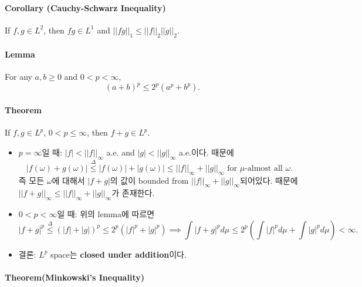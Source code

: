 \documentclass[]{article}
\providecommand{\tightlist}{%
  \setlength{\itemsep}{0pt}\setlength{\parskip}{0pt}}
\let\oldparagraph\paragraph
\renewcommand{\paragraph}[1]{\oldparagraph{#1}\mbox{}}
\begin{document}
\hypertarget{corollary-cauchy-schwarz-inequality}{%
\paragraph{Corollary (Cauchy-Schwarz
Inequality)}\label{corollary-cauchy-schwarz-inequality}}

If \(f,g\in L^2\), then \(fg\in L^1\) and
\(||fg||_1\le ||f||_2||g||_2\).

\hypertarget{lemma-2}{%
\paragraph{Lemma}\label{lemma-2}}

For any \(a,b\ge 0\) and \(0<p<\infty\), \[
(a+b)^p\le 2^p(a^p+b^p).
\]

\hypertarget{theorem}{%
\paragraph{Theorem}\label{theorem}}

If \(f,g\in L^p\), \(0<p\le\infty\), then \(f+g\in L^p\).

\begin{itemize}
\item
  \(p=\infty\)일 때: \(|f|<||f||_\infty\) a.e. and \(|g|<||g||_\infty\)
  a.e.이다. 때문에 \[
     |f(\omega)+g(\omega)|\stackrel{\Delta}{\le} |f(\omega)|+|g(\omega)|\le ||f||_\infty+||g||_\infty \mbox{ for }\mu\mbox{-almost all }\omega.
     \] 즉 모든 \(\omega\)에 대해서 \(|f+g|\)의 값이 bounded from
  \(||f||_\infty+||g||_\infty\)되어있다. 때문에
  \(||f+g||_\infty\le||f||_\infty+||g||_\infty\)가 존재한다.
\item
  \(0<p<\infty\)일 때: 위의 lemma에 따르면 \[
     |f+g|^p\stackrel{\Delta}{\le}(|f|+|g|)^p\le 2^p(|f|^p+|g|^p)\implies \int|f+g|^pd\mu\le 2^p(\int|f|^pd\mu+\int|g|^pd\mu) <\infty.
     \]
\end{itemize}

\begin{itemize}
\tightlist
\item
  결론: \(L^p\) space는 \textbf{closed under addition}이다.
\end{itemize}

\hypertarget{theoremminkowskis-inequality}{%
\paragraph{Theorem(Minkowski's
Inequality)}\label{theoremminkowskis-inequality}}
\end{document}
